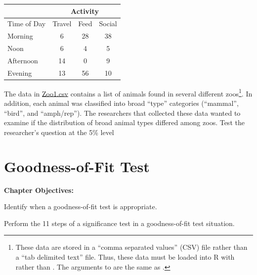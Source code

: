\documentclass[10pt,openany]{book}\usepackage[]{graphicx}\usepackage[]{color}
\begin{document}
\begin{exsection}
  \begin{center}
    \begin{tabular}{|l|c|c|c|}
      \cline{2-4}
      \multicolumn{1}{l|}{} & \multicolumn{3}{c|}{Activity} \\
      \hline
      Time of Day & Travel & Feed & Social \\
      \hline
      Morning & 6 & 28 & 38 \\
      \hline
      Noon & 6 & 4 & 5 \\
      \hline
      Afternoon & 14 & 0 & 9 \\
      \hline
      Evening & 13 & 56 & 10 \\
      \hline
    \end{tabular}
  \end{center}

  \item \label{revex:chiZoo1} \rhw{} The data in \href{}{Zoo1.csv} contains a list of animals found in several different zoos\footnote{These data are stored in a ``comma separated values'' (CSV) file rather than a ``tab delimited text'' file.  Thus, these data must be loaded into R with  rather than .  The arguments to  are the same as .}.  In addition, each animal was classified into broad ``type'' categories (``mammal'', ``bird'', and ``amph/rep'').  The researchers that collected these data wanted to examine if the distribution of broad animal types differed among zoos.  Test the researcher's question at the 5\% level 

\end{exsection}



\chapter[Goodness-of-Fit]{Goodness-of-Fit Test} \label{chap:GOF}

\begin{ChapObj}{\boxwidth}
  \textbf{Chapter Objectives:}
  \begin{Enumerate}
    \item Identify when a goodness-of-fit test is appropriate.
    \item Perform the 11 steps of a significance test in a goodness-of-fit test situation.
  \end{Enumerate}
\end{ChapObj}

\minitoc
\newpage
\end{document}
